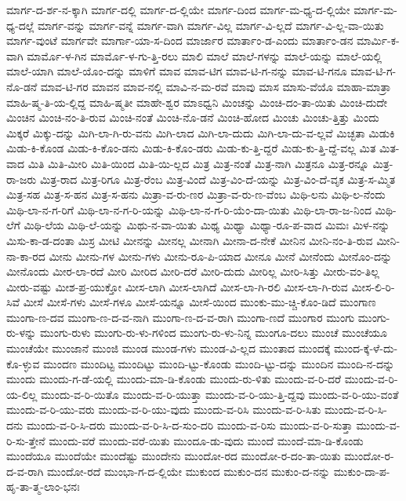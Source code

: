 {ಮಾರ್ಗ-ದ-ರ್ಶ-ನ-ಕ್ಕಾಗಿ
ಮಾರ್ಗ-ದಲ್ಲಿ
ಮಾರ್ಗ-ದ-ಲ್ಲಿಯೇ
ಮಾರ್ಗ-ದಿಂದ
ಮಾರ್ಗ-ಮ-ಧ್ಯ-ದ-ಲ್ಲಿಯೇ
ಮಾರ್ಗ-ಮ-ಧ್ಯ-ದಲ್ಲೆ
ಮಾರ್ಗ-ವನ್ನು
ಮಾರ್ಗ-ವನ್ನೆ
ಮಾರ್ಗ-ವಾಗಿ
ಮಾರ್ಗ-ವಿಲ್ಲ
ಮಾರ್ಗ-ವಿ-ಲ್ಲದೆ
ಮಾರ್ಗ-ವಿ-ಲ್ಲ-ವಾ-ಯಿತು
ಮಾರ್ಗ-ವುಂಟೆ
ಮಾರ್ಗವೇ
ಮಾರ್ಗಾ-ಯಾ-ಸ-ದಿಂದ
ಮಾರ್ಜಾರ
ಮಾರ್ತಾಂ-ಡ-ಎಂದು
ಮಾರ್ತಾಂ-ಡನ
ಮಾರ್ಮಿ-ಕ-ವಾಗಿ
ಮಾರ್ಮೊ-ಳ-ಗಿನ
ಮಾರ್ಮೊ-ಳ-ಗು-ತ್ತಿ-ರಲು
ಮಾಲಿ
ಮಾಲೆ
ಮಾಲೆ-ಗಳನ್ನು
ಮಾಲೆ-ಯನ್ನು
ಮಾಲೆ-ಯಲ್ಲಿ
ಮಾಲೆ-ಯಾಗಿ
ಮಾಲೆ-ಯೊಂ-ದನ್ನು
ಮಾಳಿಗೆ
ಮಾವ
ಮಾವ-ಟಿಗ
ಮಾವ-ಟಿ-ಗ-ನನ್ನು
ಮಾವ-ಟಿ-ಗನೂ
ಮಾವ-ಟಿ-ಗ-ನೊ-ಡನೆ
ಮಾವ-ಟಿ-ಗರ
ಮಾವನ
ಮಾವ-ನಲ್ಲಿ
ಮಾವಿ-ನ-ಮ-ರವೆ
ಮಾವು
ಮಾಸ
ಮಾಸು-ವೆಯೊ
ಮಾಹಾ-ಮಾತ್ರಾ
ಮಾಹಿ-ಷ್ಮ-ತಿ-ಯ-ಲ್ಲಿದ್ದ
ಮಾಹಿ-ಷ್ಮತೀ
ಮಾಹೇ-ಶ್ವರ
ಮಾಽಧ್ವನಿ
ಮಿಂಚನ್ನು
ಮಿಂಚಿ-ದಂ-ತಾ-ಯಿತು
ಮಿಂಚಿ-ದುದೇ
ಮಿಂಚಿನ
ಮಿಂಚಿ-ನಂ-ತಿ-ರುವ
ಮಿಂಚಿ-ನಂತೆ
ಮಿಂಚಿ-ನೊ-ಡನೆ
ಮಿಂಚಿ-ಹೋದ
ಮಿಂಚು
ಮಿಂಚು-ತ್ತಿತ್ತು
ಮಿಂದು
ಮಿಕ್ಕರೆ
ಮಿಕ್ಕು-ದನ್ನು
ಮಿಗಿ-ಲಾ-ಗಿ-ರು-ವನು
ಮಿಗಿ-ಲಾದ
ಮಿಗಿ-ಲಾ-ದುದು
ಮಿಗಿ-ಲಾ-ದು-ವ-ಲ್ಲವೆ
ಮಿಚ್ಛತಾ
ಮಿಡುಕಿ
ಮಿಡು-ಕಿ-ಕೊಂಡ
ಮಿಡು-ಕಿ-ಕೊಂ-ಡನು
ಮಿಡು-ಕಿ-ಕೊಂ-ಡರು
ಮಿಡು-ಕು-ತ್ತಿ-ದ್ದರೆ
ಮಿಡು-ಕು-ತ್ತಿ-ದ್ದೆ-ವಲ್ಲ
ಮಿತ
ಮಿತ-ವಾದ
ಮಿತಿ
ಮಿತಿ-ಮೀರಿ
ಮಿತಿ-ಯಿಂದ
ಮಿತಿ-ಯಿ-ಲ್ಲದ
ಮಿತ್ರ
ಮಿತ್ರ-ನಂತೆ
ಮಿತ್ರ-ನಾಗಿ
ಮಿತ್ರನೂ
ಮಿತ್ರ-ರನ್ನೂ
ಮಿತ್ರ-ರಾ-ಜರು
ಮಿತ್ರ-ರಾದ
ಮಿತ್ರ-ರಿಗೂ
ಮಿತ್ರ-ರೆಂಬ
ಮಿತ್ರ-ವಿಂದೆ
ಮಿತ್ರ-ವಿಂ-ದೆ-ಯನ್ನು
ಮಿತ್ರ-ವಿಂ-ದೆ-ವೃಕ
ಮಿತ್ರ-ಸ-ಮ್ಮಿತ
ಮಿತ್ರ-ಸಹ
ಮಿತ್ರ-ಸ-ಹನ
ಮಿತ್ರ-ಸ-ಹನು
ಮಿತ್ರಾ-ವ-ರು-ಣರ
ಮಿತ್ರಾ-ವ-ರು-ಣ-ವೆಂಬ
ಮಿಥಿ-ಲನು
ಮಿಥಿ-ಲ-ನೆಂದು
ಮಿಥಿ-ಲಾ-ನ-ಗ-ರಿಗೆ
ಮಿಥಿ-ಲಾ-ನ-ಗ-ರಿ-ಯನ್ನು
ಮಿಥಿ-ಲಾ-ನ-ಗ-ರಿ-ಯೆಂ-ದಾ-ಯಿತು
ಮಿಥಿ-ಲಾ-ರಾ-ಜ-ನಿಂದ
ಮಿಥಿ-ಲೆಗೆ
ಮಿಥಿ-ಲೆಯ
ಮಿಥಿ-ಲೆ-ಯನ್ನು
ಮಿಥು-ನ-ವಾ-ಯಿತು
ಮಿಥ್ಯ
ಮಿಥ್ಯಾ
ಮಿಥ್ಯಾ-ರೂ-ಪ-ವಾದ
ಮಿಮಃ
ಮಿಳ-ನನ್ನು
ಮಿಸು-ಕಾ-ಡ-ದಂತಾ
ಮಿಸ್ರ
ಮೀಟಿ
ಮೀನನ್ನು
ಮೀನಲ್ಲ
ಮೀನಾಗಿ
ಮೀನಾ-ದ-ನೇಕೆ
ಮೀನಿನ
ಮೀನಿ-ನಂ-ತಿ-ರುವ
ಮೀನಿ-ನಾ-ಕಾ-ರದ
ಮೀನು
ಮೀನು-ಗಳ
ಮೀನು-ಗಳು
ಮೀನು-ರೂ-ಪಿ-ಯಾದ
ಮೀನೂ
ಮೀನೆ
ಮೀನೆಂದು
ಮೀನೊಂ-ದನ್ನು
ಮೀನೊಂದು
ಮೀರ-ಲಾ-ರದೆ
ಮೀರಿ
ಮೀರಿದ
ಮೀರಿ-ದರೆ
ಮೀರಿ-ದುದು
ಮೀರಿಲ್ಲ
ಮೀರಿ-ಸಿತ್ತು
ಮೀರು-ವಂ-ತಿಲ್ಲ
ಮೀರು-ವಷ್ಟು
ಮೀಶ-ಪ್ರ-ಯುಕ್ತೋ
ಮೀಸ-ಲಾಗಿ
ಮೀಸ-ಲಾಗಿದೆ
ಮೀಸ-ಲಾ-ಗಿ-ರಲಿ
ಮೀಸ-ಲಾ-ಗಿ-ರುವ
ಮೀಸ-ಲಿ-ರಿ-ಸಿವೆ
ಮೀಸೆ
ಮೀಸೆ-ಗಳು
ಮೀಸೆ-ಗಳೂ
ಮೀಸೆ-ಯನ್ನೂ
ಮೀಸೆ-ಯಿಂದ
ಮುಂಕು-ಮು-ಚ್ಚಿ-ಕೊಂ-ಡಿದೆ
ಮುಂಗಾಣ
ಮುಂಗಾ-ಣ-ದವ
ಮುಂಗಾ-ಣ-ದ-ವ-ನಾಗಿ
ಮುಂಗಾ-ಣ-ದ-ವ-ರಾಗಿ
ಮುಂಗಾ-ಣದೆ
ಮುಂಗಾರ
ಮುಂಗು
ಮುಂಗು-ರು-ಳನ್ನು
ಮುಂಗು-ರುಳು
ಮುಂಗು-ರು-ಳು-ಗಳಿಂದ
ಮುಂಗು-ರು-ಳು-ನಿನ್ನ
ಮುಂಗೂ-ದಲು
ಮುಂಚೆ
ಮುಂಚೆಯೂ
ಮುಂಚೆಯೇ
ಮುಂಜಾನೆ
ಮುಂಜಿ
ಮುಂಡ
ಮುಂಡ-ಗಳು
ಮುಂಡ-ವಿ-ಲ್ಲದ
ಮುಂತಾದ
ಮುಂದಕ್ಕೆ
ಮುಂದ-ಕ್ಕೆ-ಳೆ-ದು-ಕೊ-ಳ್ಳುವ
ಮುಂದಣ
ಮುಂದಿಟ್ಟ
ಮುಂದಿಟ್ಟು
ಮುಂದಿ-ಟ್ಟು-ಕೊಂಡು
ಮುಂದಿ-ಟ್ಟು-ದನ್ನು
ಮುಂದಿನ
ಮುಂದಿ-ನ-ದನ್ನು
ಮುಂದು
ಮುಂದು-ಗ-ಡೆ-ಯಲ್ಲಿ
ಮುಂದು-ಮಾ-ಡಿ-ಕೊಂಡು
ಮುಂದು-ರು-ಳಿತು
ಮುಂದು-ವ-ರಿ-ದರೆ
ಮುಂದು-ವ-ರಿ-ಯ-ಲಿಲ್ಲ
ಮುಂದು-ವ-ರಿ-ಯಿತೊ
ಮುಂದು-ವ-ರಿ-ಯುತ್ತಾ
ಮುಂದು-ವ-ರಿ-ಯು-ತ್ತಿ-ದ್ದವು
ಮುಂದು-ವ-ರಿ-ಯು-ವಂತೆ
ಮುಂದು-ವ-ರಿ-ಯು-ವರು
ಮುಂದು-ವ-ರಿ-ಯು-ವುದು
ಮುಂದು-ವ-ರಿಸಿ
ಮುಂದು-ವ-ರಿ-ಸಿತು
ಮುಂದು-ವ-ರಿ-ಸಿ-ದನು
ಮುಂದು-ವ-ರಿ-ಸಿ-ದರು
ಮುಂದು-ವ-ರಿ-ಸಿ-ದ-ಸುಂ-ದರಿ
ಮುಂದು-ವ-ರಿಸು
ಮುಂದು-ವ-ರಿ-ಸುತ್ತಾ
ಮುಂದು-ವ-ರಿ-ಸು-ತ್ತೇನೆ
ಮುಂದು-ವರೆ
ಮುಂದು-ವರೆ-ಯಿತು
ಮುಂದೂ-ಡು-ವುದು
ಮುಂದೆ
ಮುಂದೆ-ಮಾ-ಡಿ-ಕೊಂಡು
ಮುಂದೆಯೂ
ಮುಂದೆಯೇ
ಮುಂದೆಷ್ಟು
ಮುಂದೇನು
ಮುಂದೋ-ರದ
ಮುಂದೋ-ರ-ದಂ-ತಾ-ಯಿತು
ಮುಂದೋ-ರ-ದ-ವ-ರಾಗಿ
ಮುಂದೋ-ರದೆ
ಮುಂಭಾ-ಗ-ದ-ಲ್ಲಿಯೇ
ಮುಕುಂದ
ಮುಕುಂ-ದನ
ಮುಕುಂ-ದ-ನನ್ನು
ಮುಕುಂ-ದಾ-ಪ-ಹೃ-ತಾ-ತ್ಮ-ಲಾಂ-ಭನಃ
}
